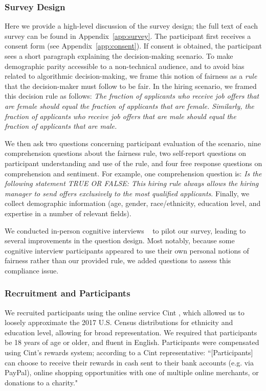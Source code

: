 \documentclass{article}
\begin{document}
\subsubsection{Survey Design}\label{methods:design}



Here we provide a high-level discussion of the survey design; the full text of each survey can be found in Appendix~\ref{app:survey}. 
The participant first receives a consent form (see Appendix~\ref{app:consent}). If consent is obtained, the participant sees a short paragraph explaining the decision-making scenario. To make demographic parity accessible to a non-technical audience, and to avoid bias related to algorithmic decision-making, we frame this notion of fairness as a \emph{rule} that the decision-maker must follow to be fair. 
In the hiring scenario, we framed this decision rule as follows:
\emph{The fraction of applicants who receive job offers that are female should equal the fraction of applicants that are female. Similarly, the fraction of applicants who receive job offers that are male should equal the fraction of applicants that are male.}

We then ask two questions concerning participant evaluation of the scenario, nine comprehension questions about the fairness rule, two self-report questions on participant understanding and use of the rule, and four free response questions on comprehension and sentiment.
For example, one comprehension question is:
\emph{Is the following statement TRUE OR FALSE: This hiring rule always allows the hiring manager to send offers exclusively to the most qualified applicants}.
Finally, we collect demographic information (age, gender, race/ethnicity, education level, and expertise in a number of  relevant fields).


We conducted in-person cognitive interviews ~\cite{harrell2009data} to pilot our survey, leading to several improvements in the question design. Most notably, because some cognitive interview participants appeared to use their own personal notions of fairness rather than our provided rule, we added questions to assess this compliance issue. 

\subsubsection{Recruitment and Participants} \label{subsubsec:methods:study1:recruitment}

We recruited participants using the online service Cint \cite{cint}, which allowed us to loosely approximate the 2017 U.S. Census distributions \cite{census07} for ethnicity and education level, allowing for broad representation. We required that participants be 18 years of age or older, and fluent in English. Participants were compensated using Cint's rewards system; according to a Cint representative: ``[Participants] can choose to receive their rewards in cash sent to their bank accounts (e.g. via PayPal), online shopping opportunities with one of multiple online merchants, or donations to a charity."
\end{document}
